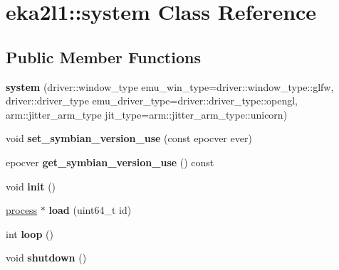 \hypertarget{classeka2l1_1_1system}{}\section{eka2l1\+:\+:system Class Reference}
\label{classeka2l1_1_1system}
\subsection*{Public Member Functions}
\begin{DoxyCompactItemize}
\item 
\mbox{\label{classeka2l1_1_1system_a5f76c43b2b6cf1ba252b285591eccd23}} 
{\bfseries system} (driver\+::window\+\_\+type emu\+\_\+win\+\_\+type=driver\+::window\+\_\+type\+::glfw, driver\+::driver\+\_\+type emu\+\_\+driver\+\_\+type=driver\+::driver\+\_\+type\+::opengl, arm\+::jitter\+\_\+arm\+\_\+type jit\+\_\+type=arm\+::jitter\+\_\+arm\+\_\+type\+::unicorn)
\item 
\mbox{\label{classeka2l1_1_1system_ad1ecaf6db921e4a0fb2916ceb2274874}} 
void {\bfseries set\+\_\+symbian\+\_\+version\+\_\+use} (const epocver ever)
\item 
\mbox{\label{classeka2l1_1_1system_a4f7656dd0b85786c939ab5ca5f174099}} 
epocver {\bfseries get\+\_\+symbian\+\_\+version\+\_\+use} () const
\item 
\mbox{\label{classeka2l1_1_1system_aee917e051b3664a87164ea3a5bdbb5f7}} 
void {\bfseries init} ()
\item 
\mbox{\label{classeka2l1_1_1system_a37cbeee19a1376cbb0459f765205e3e1}} 
\mbox{\hyperlink{classeka2l1_1_1process}{process}} $\ast$ {\bfseries load} (uint64\+\_\+t id)
\item 
\mbox{\label{classeka2l1_1_1system_a1ba55b4eec5d542e48288f06d8f1652b}} 
int {\bfseries loop} ()
\item 
\mbox{\label{classeka2l1_1_1system_adf6e867a2b6944efb75626882eea2ac5}} 
void {\bfseries shutdown} ()
\item 
\mbox{\label{classeka2l1_1_1system_a8eeb07b16c52b0302d9c85a12fbb9f4b}} 

\end{DoxyCompactItemize}
